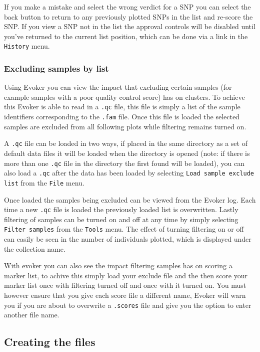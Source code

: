 \documentclass{article}
\begin{document}
If you make a mistake and select the wrong verdict for a SNP you can select the back button to return to any previously plotted SNPs in the list and re-score the SNP. If you view a SNP not in the list the approval controls will be disabled until you've returned to the current list position, which can be done via a link in the \texttt{History} menu.

\subsubsection{Excluding samples by list}
Using Evoker you can view the impact that excluding certain samples (for example samples with a poor quality control score) has on clusters. To achieve this Evoker is able to read in a \texttt{.qc} file, this file is simply a list of the sample identifiers corresponding to the \texttt{.fam} file. Once this file is loaded the selected samples are excluded from all following plots while filtering remains turned on.

A \texttt{.qc}  file can be loaded in two ways, if placed in the same directory as a set of default data files it will be loaded when the directory is opened  (note: if there is more than one \texttt{.qc} file in the directory the first found will be loaded), you can also load a  \texttt{.qc} after the data has been loaded by selecting \texttt{Load sample exclude list} from the \texttt{File} menu. 

Once loaded the samples being excluded can be viewed from the Evoker log. Each time a new \texttt{.qc} file is loaded the previously loaded list is overwritten. Lastly filtering of samples can be turned on and off at any time by simply selecting \texttt{Filter samples} from the \texttt{Tools} menu. The effect of turning filtering on or off can easily be seen in the number of individuals plotted, which is displayed under the collection name.

With evoker you can also see the impact filtering samples has on scoring a marker list, to achive this simply load your exclude file and the then score your marker list once with filtering turned off and once with it turned on. You must however ensure that you give each score file a different name, Evoker will warn you if you are about to overwrite a \texttt{.scores} file and give you the option to enter another file name.

\subsection{Creating the files}
\end{document}
